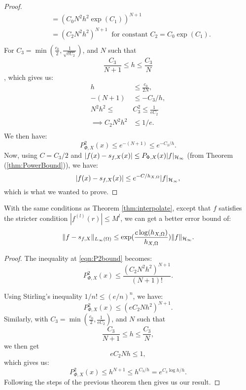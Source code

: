 \documentclass[twoside]{memoir}
\begin{document}
\begin{proof}
\begin{equation}
\begin{split}
	&= (C_0 N^2 h^2\exp(C_1))^{N+1} \\
	&= (C_2 N^2 h^2)^{N+1} ~ \text{ for constant }C_2 = C_0\exp(C_1). \\
	\end{split}
	\end{equation}
	For $C_3 = \min(\frac{c_0}{2}, \frac{1}{\sqrt{e C_2}})$, and $N$ such that
	\[ \frac{C_3}{N+1} \leq h \leq \frac{C_3}{N} \], which gives us:
	\begin{equation*}
	\begin{split}
	h &\leq \frac{c_0}{2N}, \\
	-(N+1) &\leq -C_3/h, \\
	N^2h^2 \leq &C_3^2 \leq \frac{1}{eC_2} \\
	\implies C_2N^2h^2 &\leq  1/e. \\
	\end{split}
	\end{equation*}
	We then have:
	\begin{equation*}
	P^2_{\Phi, X}(x) \leq e^{-(N+1)} \leq e^{-C_3/h}. 
	\end{equation*}
	Now, using $C= C_3/2$ and $|f(x) - s_{f, X}(x)| \leq P_{\Phi, X}(x) |f|_{\mathcal{H}_\infty}$ (from Theorem (\ref{thm:PowerBound})), we have:
	\[ |f(x) - s_{f, X}(x)| \leq e^{-C/h_{X,\Omega}} |f|_{\mathcal{H}_\infty}, \]
	which is what we wanted to prove.
\end{proof}

\begin{thm}
	With the same conditions as Theorem \ref{thm:interpolate}, except that $f$ satisfies the stricter condition $|f^{(l)}(r)| \leq M^l$, we can get a better error bound of:
	\[ \lVert f - s_{f,X}\rVert_{L_\infty(\Omega)} \leq \exp(\frac{c \log(h_{X,\Omega})}{h_{X,\Omega}})\lVert f\rVert_{\mathcal{H}_\infty}. \]
\end{thm}
\begin{proof}
	The inequality at \ref{eqn:P2bound} becomes:
	\[ P^2_{\Phi, X}(x) \leq  \frac{(C_2 N^2 h^2)^{N+1}}{(N+1)!}. \]
	
	Using Stirling's inequality $1/n! \leq (e/n)^n$, we have:
	\[ P^2_{\Phi, X}(x) \leq (eC_2 N h^2)^{N+1}. \]
	Similarly, with $C_3 = \min(\frac{c_0}{2}, \frac{1}{e C_2})$, and $N$ such that
	\[ \frac{C_3}{N+1} \leq h \leq \frac{C_3}{N}, \] we then get \[ eC_2Nh \leq 1, \] which gives us:
	\[ P^2_{\Phi,X}(x) \leq h^{N+1} \leq h^{C_3/h} = e^{C_3 \log h / h}. \]
	Following the steps of the previous theorem then gives us our result.
\end{proof}
\end{document}
